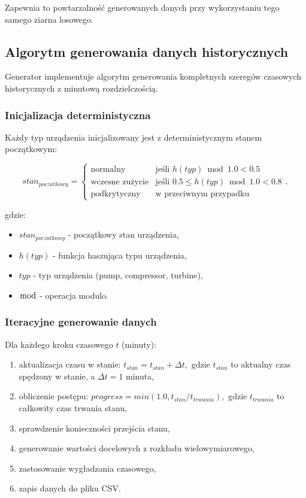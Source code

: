 Zapewnia to powtarzalność generowanych danych przy wykorzystaniu tego samego ziarna losowego.

\subsection{Algorytm generowania danych historycznych}
\label{subsec:algorytm_historycznych}

Generator implementuje algorytm generowania kompletnych szeregów czasowych historycznych z minutową rozdzielczością.

\subsubsection{Inicjalizacja deterministyczna}

Każdy typ urządzenia inicjalizowany jest z deterministycznym stanem początkowym:

\begin{equation}
stan_{poczatkowy} = \begin{cases}
\text{normalny} & \text{je\'sli } h(typ) \bmod 1.0 < 0.5 \\
\text{wczesne zu\.{z}ycie} & \text{je\'sli } 0.5 \leq h(typ) \bmod 1.0 < 0.8 \\
\text{podkrytyczny} & \text{w przeciwnym przypadku}
\end{cases},
\end{equation}

gdzie:
\begin{itemize}
    \item $stan_{poczatkowy}$ - początkowy stan urządzenia,
    \item $h(typ)$ - funkcja haszująca typu urządzenia,
    \item $typ$ - typ urządzenia (pump, compressor, turbine),
    \item $\bmod$ - operacja modulo.
\end{itemize}

\subsubsection{Iteracyjne generowanie danych}

Dla każdego kroku czasowego $t$ (minuty):

\begin{enumerate}
    \item aktualizacja czasu w stanie: $t_{stan} = t_{stan} + \Delta t,$ gdzie $t_{stan}$ to aktualny czas spędzony w stanie, a $\Delta t = 1$ minuta,
    \item obliczenie postępu: $progress = \textit{min}(1.0, t_{stan} / t_{trwania}),$ gdzie $t_{trwania}$ to całkowity czas trwania stanu,
    \item sprawdzenie konieczności przejścia stanu,
    \item generowanie wartości docelowych z rozkładu wielowymiarowego,
    \item zastosowanie wygładzania czasowego,
    \item zapis danych do pliku CSV.
\end{enumerate}

